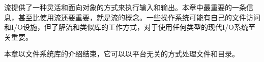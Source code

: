 流提供了一种灵活和面向对象的方式来执行输入和输出。本章中最重要的一条信息，甚至比使用流还要重要，就是流的概念。一些操作系统可能有自己的文件访问和I/O设施，但了解流和类似库的工作方式，对于使用任何类型的现代I/O系统至关重要。

本章以文件系统库的介绍结束，它可以以平台无关的方式处理文件和目录。
